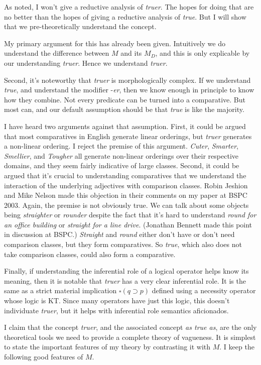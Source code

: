 As noted, I won't give a reductive analysis of \emph{truer}. The hopes
for doing that are no better than the hopes of giving a reductive
analysis of \emph{true}. But I will show that we pre-theoretically
understand the concept.

My primary argument for this has already been given. Intuitively we do
understand the difference between \(M\) and its \(M_D\), and this is
only explicable by our understanding \emph{truer}. Hence we understand
\emph{truer}.

Second, it's noteworthy that \emph{truer} is morphologically complex. If
we understand \emph{true}, and understand the modifier -\emph{er}, then
we know enough in principle to know how they combine. Not every
predicate can be turned into a comparative. But most can, and our
default assumption should be that \emph{true} is like the majority.

I have heard two arguments against that assumption. First, it could be
argued that most comparatives in English generate linear orderings, but
\emph{truer} generates a non-linear ordering. I reject the premise of
this argument. \emph{Cuter}, \emph{Smarter}, \emph{Smellier}, and
\emph{Tougher} all generate non-linear orderings over their respective
domains, and they seem fairly indicative of large classes. Second, it
could be argued that it's crucial to understanding comparatives that we
understand the interaction of the underlying adjectives with comparison
classes. Robin Jeshion and Mike Nelson made this objection in their
comments on my paper at BSPC 2003. Again, the premise is not obviously
true. We can talk about some objects being \emph{straighter} or
\emph{rounder} despite the fact that it's hard to understand \emph{round
for an office building} or \emph{straight for a line drive}. (Jonathan
Bennett made this point in discussion at BSPC.) \emph{Straight} and
\emph{round} either don't have or don't need comparison classes, but
they form comparatives. So \emph{true}, which also does not take
comparison classes, could also form a comparative.

Finally, if understanding the inferential role of a logical operator
helps know its meaning, then it is notable that \emph{truer} has a very
clear inferential role. It is the same as a strict material implication
\(\square (q \supset p)\) defined using a necessity operator whose logic
is KT. Since many operators have just this logic, this doesn't
individuate \emph{truer}, but it helps with inferential role semantics
aficionados.

I claim that the concept \emph{truer}, and the associated concept
\emph{as true as}, are the only theoretical tools we need to provide a
complete theory of vagueness. It is simplest to state the important
features of my theory by contrasting it with \(M\). I keep the following
good features of \(M\).

